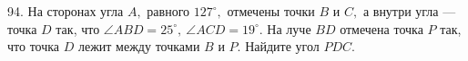 94. На сторонах угла $A,$ равного $127^\circ,$ отмечены точки $B$ и $C,$ а внутри угла --- точка $D$ так, что $\angle ABD=25^\circ,\ \angle ACD=19^\circ.$ На луче $BD$ отмечена точка $P$ так, что точка $D$ лежит между точками $B$ и $P.$ Найдите угол $PDC.$\\
